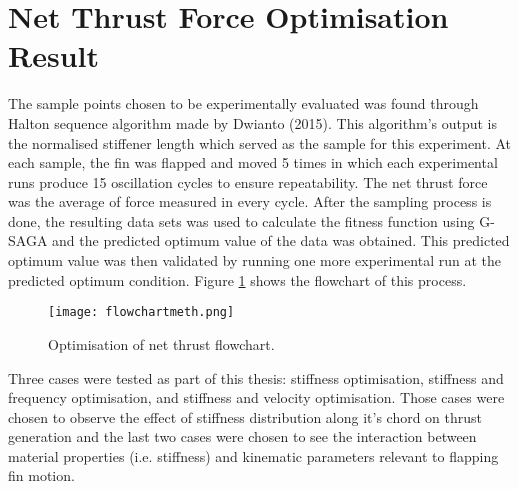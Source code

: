 \section{Net Thrust Force Optimisation Result}
\label{sec:optimiseresult}
The sample points chosen to be experimentally evaluated was found through Halton sequence algorithm made by Dwianto (2015). This algorithm's output is the normalised stiffener length which served as the sample for this experiment. At each sample, the fin was flapped and moved 5 times in which each experimental runs produce 15 oscillation cycles to ensure repeatability. The net thrust force was the average of force measured in every cycle. After the sampling process is done, the resulting data sets was used to calculate the fitness function using G-SAGA and the predicted optimum value of the data was obtained. This predicted optimum value was then validated by running one more experimental run at the predicted optimum condition. Figure \ref{fig:flowchartmeth} shows the flowchart of this process.\par
\begin{figure}[H]
    \centering
    \texttt{[image: flowchartmeth.png]}
    \caption{Optimisation of net thrust flowchart.}
    \label{fig:flowchartmeth}
\end{figure}
Three cases were tested as part of this thesis: stiffness optimisation, stiffness and frequency optimisation, and stiffness and velocity optimisation. Those cases were chosen to observe the effect of stiffness distribution along it's chord on thrust generation and the last two cases were chosen to see the interaction between material properties (i.e. stiffness) and kinematic parameters relevant to flapping fin motion.\par

